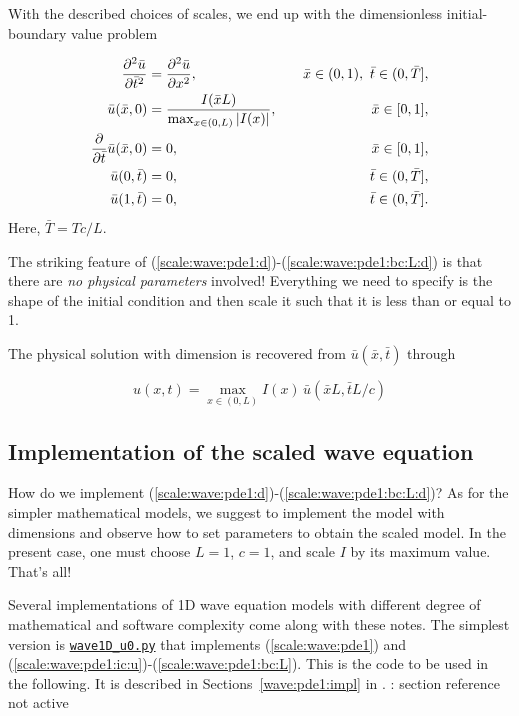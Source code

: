 \documentclass[graybox,envcountchap,sectrefs,final]{svmonodo}
\newcommand{\shortinlinecomment}[3]{{\color{red}{\bf #1}: #2}}
\begin{document}
With the described choices of scales,
we end up with the dimensionless initial-boundary value problem

\begin{align}
\frac{\partial^2 \bar u}{\partial \bar t^2} &=
{\partial^2 \bar u\over\partial x^2}, \quad & \bar x\in (0,1),\ \bar t\in (0,\bar T],
\label{scale:wave:pde1:d}\\ 
\bar u(\bar x,0) &= \frac{I(\bar x L)}{\max_{x\in(0,L)} |I(x)|},
\quad &\bar x\in [0,1],
\label{scale:wave:pde1:ic:u:d}\\ 
{\partial\over\partial \bar t}\bar u(\bar x,0) &= 0,
\quad & \bar x\in [0,1],
\label{scale:wave:pde1:ic:ut:d}\\ 
\bar u(0,\bar t) & = 0,
\quad  &\bar t\in (0,\bar T],
\label{scale:wave:pde1:bc:0:d}\\ 
\bar u(1,\bar t) & = 0,
\quad  &\bar t\in (0,\bar T].
\label{scale:wave:pde1:bc:L:d}
\end{align}
Here, $\bar T = Tc/L$.

The striking feature of
(\ref{scale:wave:pde1:d})-(\ref{scale:wave:pde1:bc:L:d})
is that there are \emph{no physical parameters} involved! Everything we need
to specify is the shape of the initial condition and then scale it
such that it is less than or equal to 1.

The physical solution with dimension is recovered from $\bar u(\bar x,\bar t)$
through

\begin{equation}
u(x,t) = \max_{x\in(0,L)}I(x)\,\bar u(\bar x L, \bar t L/c)
\end{equation}

\subsection{Implementation of the scaled wave equation}

How do we implement (\ref{scale:wave:pde1:d})-(\ref{scale:wave:pde1:bc:L:d})?
As for the simpler mathematical models, we suggest to implement the model
with dimensions and observe how to set parameters to obtain the scaled
model. In the present case, one must choose $L=1$, $c=1$, and scale $I$ by its
maximum value. That's all!

Several implementations of 1D wave equation models with different
degree of mathematical and software complexity come along with these
notes. The simplest
version is \href{{http://tinyurl.com/o8pb3yy/wave1D_u0.py}}{\nolinkurl{wave1D_u0.py}}
that implements (\ref{scale:wave:pde1}) and
(\ref{scale:wave:pde1:ic:u})-(\ref{scale:wave:pde1:bc:L}).
This is the code to be used in the following. It is described
in Sections~\ref{wave:pde1:impl} in \cite{Langtangen_Linge_fdm}.
\shortinlinecomment{Geir 2}{ section reference not active }{ section reference not active }
\end{document}

